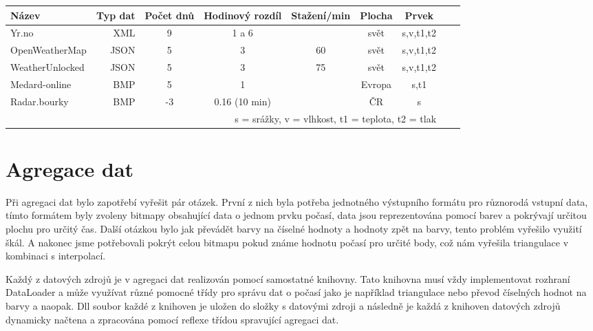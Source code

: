 \documentclass[czech,bachelor,dept460,male,csharp,cpdeclaration]{diploma}
\begin{document}
	\begin{center}
		
		
		\begin{tabular} {l r c c c c c c c}
			
			Název & Typ dat & Počet dnů & Hodinový rozdíl & Stažení/min & Plocha & Prvek \\
			\hline
			Yr.no & XML & 9 & 1 a 6 & & svět & s,v,t1,t2 \\ 
			OpenWeatherMap & JSON & 5 & 3 & 60 & svět & s,v,t1,t2 \\ 
			WeatherUnlocked & JSON & 5 & 3 & 75 & svět & s,v,t1,t2 \\ 
			Medard-online & BMP & 5 & 1 &  & Evropa & s,t1 \\ 
			Radar.bourky & BMP & -3 & 0.16 (10 min)& & ČR & s \\ 
			
			\multicolumn{7}{r}{\footnotesize *s = srážky, v = vlhkost, t1 = teplota, t2 = tlak}\\
			
		\end{tabular}
	\end{center}
	
	\chapter{Agregace dat}
	
	Při agregaci dat bylo zapotřebí vyřešit pár otázek. První z nich byla potřeba jednotného výstupního formátu pro různorodá vstupní data, tímto formátem byly zvoleny bitmapy obsahující data o jednom prvku počasí, data jsou reprezentována pomocí barev a pokrývají určitou plochu pro určitý čas. Další otázkou bylo jak převádět barvy na číselné hodnoty a hodnoty zpět na barvy, tento problém vyřešilo využití škál. A nakonec jsme potřebovali pokrýt celou bitmapu pokud známe hodnotu počasí pro určité body, což nám vyřešila triangulace v kombinaci s interpolací.
	
	Každý z datových zdrojů je v agregaci dat realizován pomocí samostatné knihovny. Tato knihovna musí vždy implementovat rozhraní DataLoader a může využívat různé pomocné třídy pro správu dat o počasí jako je například triangulace nebo převod číselných hodnot na barvy a naopak. Dll soubor každé z knihoven je uložen do složky s datovými zdroji a následně je každá z knihoven datových zdrojů dynamicky načtena a zpracována pomocí reflexe třídou spravující agregaci dat.
	
\end{document}
